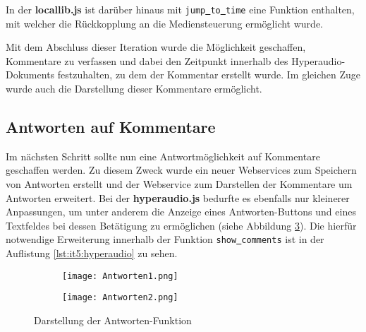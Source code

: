In der \textbf{locallib.js} ist darüber hinaus mit \texttt{jump\underline{{ }}to\underline{{ }}time} eine Funktion enthalten, mit welcher die Rückkopplung an die Mediensteuerung ermöglicht wurde.

Mit dem Abschluss dieser Iteration wurde die Möglichkeit geschaffen, Kommentare zu verfassen und dabei den Zeitpunkt innerhalb des Hyperaudio-Dokuments festzuhalten, zu dem der Kommentar erstellt wurde. Im gleichen Zuge wurde auch die Darstellung dieser Kommentare ermöglicht.

\subsection{Antworten auf Kommentare}
Im nächsten Schritt sollte nun eine Antwortmöglichkeit auf Kommentare geschaffen werden. Zu diesem Zweck wurde ein neuer Webservices zum Speichern von Antworten erstellt und der Webservice zum Darstellen der Kommentare um Antworten erweitert. Bei der \textbf{hyperaudio.js} bedurfte es ebenfalls nur kleinerer Anpassungen, um unter anderem die Anzeige eines Antworten-Buttons und eines Textfeldes bei dessen Betätigung zu ermöglichen (siehe Abbildung \ref{fig:Antworten}). Die hierfür notwendige Erweiterung innerhalb der Funktion \texttt{show\underline{{ }}comments} ist in der Auflistung \ref{lst:it5:hyperaudio} zu sehen.

\begin{figure}[h!]
\begin{subfigure}[c]{0.5\textwidth}
\texttt{[image: Antworten1.png]}
\label{fig:Antworten1}
\end{subfigure}%
\begin{subfigure}[c]{0.5\textwidth}
\texttt{[image: Antworten2.png]}
\label{fig:Antworten2}
\end{subfigure}
\caption{Darstellung der Antworten-Funktion}
\label{fig:Antworten}
\end{figure}

